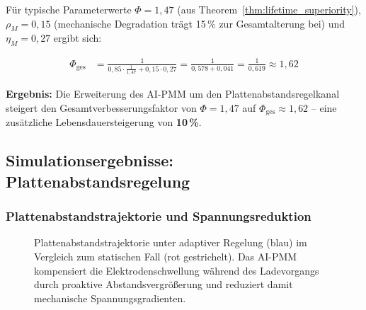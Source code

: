 ﻿\documentclass[12pt,a4paper]{article}
\begin{document}
Für typische Parameterwerte $\Phi = 1{,}47$ (aus Theorem~\ref{thm:lifetime_superiority}),
$\rho_M = 0{,}15$ (mechanische Degradation trägt 15\,\% zur Gesamtalterung bei)
und $\eta_M = 0{,}27$ ergibt sich:

\begin{align}
	\Phi_\mathrm{ges} &= \frac{1}{0{,}85 \cdot \frac{1}{1{,}47} + 0{,}15 \cdot 0{,}27}
	= \frac{1}{0{,}578 + 0{,}041} = \frac{1}{0{,}619} \approx 1{,}62
	\label{eq:phi_total_numerical}
\end{align}

\textbf{Ergebnis:} Die Erweiterung des AI-PMM um den Plattenabstandsregelkanal
steigert den Gesamtverbesserungsfaktor von $\Phi = 1{,}47$ auf
$\Phi_\mathrm{ges} \approx 1{,}62$ -- eine zusätzliche Lebensdauersteigerung
von \textbf{10\,\%}.

\subsection{Simulationsergebnisse: Plattenabstandsregelung}

\subsubsection{Plattenabstandstrajektorie und Spannungsreduktion}

\begin{figure}[H]
	\centering
	\caption{Plattenabstandstrajektorie unter adaptiver Regelung (blau) im
		Vergleich zum statischen Fall (rot gestrichelt). Das AI-PMM kompensiert
		die Elektrodenschwellung während des Ladevorgangs durch proaktive
		Abstandsvergrößerung und reduziert damit mechanische Spannungsgradienten.}
	\label{fig:plate_trajectory}
\end{figure}
\end{document}
